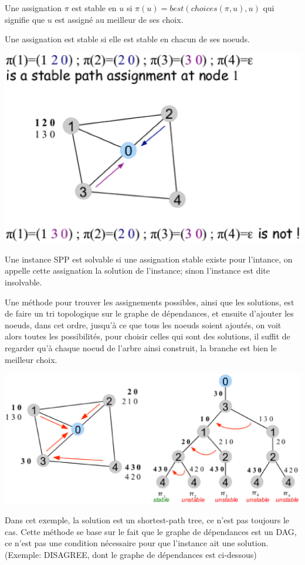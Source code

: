\documentclass{report}
\begin{document}
Une assignation $\pi$ est stable en $u$ si $\pi(u) = best(choices(\pi,
u), u)$ qui signifie que $u$ est assigné au meilleur de ses choix.

Une assignation est stable si elle est stable en chacun de ses noeuds.

\includegraphics[width=\textwidth]{sppex4.eps}

Une instance SPP est solvable si une assignation stable existe pour
l'intance, on appelle cette assignation la solution de l'instance;
sinon l'instance est dite insolvable.

Une méthode pour trouver les assignements possibles, ainsi que les
solutions, est de faire un tri topologique sur le graphe de
dépendances, et ensuite d'ajouter les noeuds, dans cet ordre, jusqu'à
ce que tous les noeuds soient ajoutés, on voit alors toutes les
possibilités, pour choisir celles qui sont des solutions, il suffit de
regarder qu'à chaque noeud de l'arbre ainsi construit, la branche est
bien le meilleur choix.

\includegraphics[width=\textwidth]{sppex5.eps}

Dans cet exemple, la solution est un shortest-path tree, ce n'est pas
toujours le cas. Cette méthode se base sur le fait que le graphe de
dépendances est un DAG, ce n'est pas une condition nécessaire pour que
l'instance ait une solution. (Exemple: DISAGREE, dont le graphe de
dépendances est ci-dessous)
\end{document}
